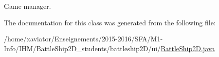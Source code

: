 Game manager. 



The documentation for this class was generated from the following file\-:\begin{DoxyCompactItemize}
\item 
/home/xaviator/\-Enseignements/2015-\/2016/\-S\-F\-A/\-M1-\/\-Info/\-I\-H\-M/\-Battle\-Ship2\-D\-\_\-students/battleship2\-D/ui/\hyperlink{BattleShip2D_8java}{Battle\-Ship2\-D.\-java}\end{DoxyCompactItemize}
